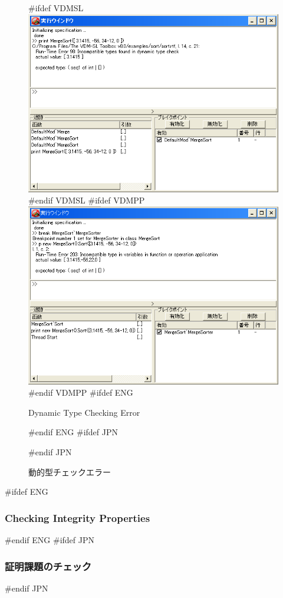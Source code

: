 \documentclass[\pformat,12pt]{article}
\begin{document}
\begin{figure}[tbh]
\begin{center}
#ifdef VDMSL
\includegraphics[width=12.5cm]{dynamicTCError-sl.png}
#endif VDMSL
#ifdef VDMPP
\includegraphics[width=12.5cm]{dynamicTCError-pp.png}
#endif VDMPP
#ifdef ENG
\caption{Dynamic Type Checking Error}
#endif ENG
#ifdef JPN
\caption{動的型チェックエラー}
#endif JPN
\label{fig:dtcerror}
\end{center}
\end{figure}

#ifdef ENG
\subsubsection{Checking Integrity Properties}\label{pogWalk}
#endif ENG
#ifdef JPN
\subsubsection{証明課題のチェック}\label{pogWalk}
#endif JPN
\end{document}
